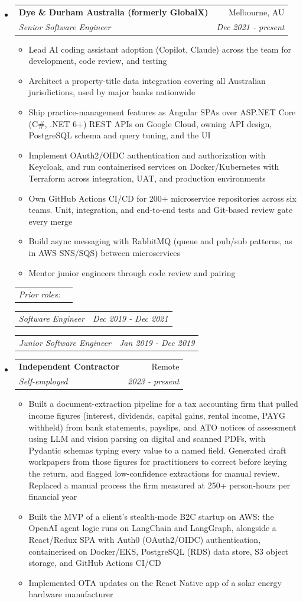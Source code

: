 \documentclass[letterpaper,11pt]{article}
\makeatletter
\newcommand{\resitem}[1]{\item #1 \vspace{-1pt}}
\newcommand{\ressubheading}[5][1.35in]{%
\begin{tabular*}{\linewidth}{@{}>{\raggedright\arraybackslash}p{\dimexpr\linewidth-#1-2pt\relax}@{\extracolsep{\fill}}r@{}}
		\textbf{#2} & #3 \\
		\textit{#4} & \textit{#5} \\
\end{tabular*}%
\vspace{3pt}%
}
\newcommand{\subsubheading}[3][2pt]{%
\vspace{#1}%
\begin{tabular*}{\linewidth}{@{}>{\raggedright\arraybackslash}p{\dimexpr\linewidth-1.35in-2pt\relax}@{\extracolsep{\fill}}r@{}}
		\textit{#2} & \textit{#3} \\
\end{tabular*}%
\vspace{2pt}%
}
\makeatother
\begin{document}
\begin{itemize}

	\item
	      \ressubheading{Dye \& Durham Australia (formerly GlobalX)}{Melbourne, AU}{Senior Software Engineer}{Dec 2021 - present}
	      \begin{itemize}
		      \resitem{Lead AI coding assistant adoption (Copilot, Claude) across the team for development, code review, and testing}
		      \resitem{Architect a property-title data integration covering all Australian jurisdictions, used by major banks nationwide}
		      \resitem{Ship practice-management features as Angular SPAs over ASP.NET Core (C\#, .NET 6+) REST APIs on Google Cloud, owning API design, PostgreSQL schema and query tuning, and the UI}
		      \resitem{Implement OAuth2/OIDC authentication and authorization with Keycloak, and run containerised services on Docker/Kubernetes with Terraform across integration, UAT, and production environments}
		      \resitem{Own GitHub Actions CI/CD for 200+ microservice repositories across six teams. Unit, integration, and end-to-end tests and Git-based review gate every merge}
		      \resitem{Build async messaging with RabbitMQ (queue and pub/sub patterns, as in AWS SNS/SQS) between microservices}
		      \resitem{Mentor junior engineers through code review and pairing}
	      \end{itemize}
	      \subsubheading{Prior roles:}{}
	      \subsubheading{Software Engineer}{Dec 2019 - Dec 2021}
	      \subsubheading{Junior Software Engineer}{Jan 2019 - Dec 2019}
	\item
	      \ressubheading{Independent Contractor}{Remote}{Self-employed}{2023 - present}
	      \begin{itemize}
		      \resitem{Built a document-extraction pipeline for a tax accounting firm that pulled income figures (interest, dividends, capital gains, rental income, PAYG withheld) from bank statements, payslips, and ATO notices of assessment using LLM and vision parsing on digital and scanned PDFs, with Pydantic schemas typing every value to a named field. Generated draft workpapers from those figures for practitioners to correct before keying the return, and flagged low-confidence extractions for manual review. Replaced a manual process the firm measured at 250+ person-hours per financial year}
		      \resitem{Built the MVP of a client's stealth-mode B2C startup on AWS: the OpenAI agent logic runs on LangChain and LangGraph, alongside a React/Redux SPA with Auth0 (OAuth2/OIDC) authentication, containerised on Docker/EKS, PostgreSQL (RDS) data store, S3 object storage, and GitHub Actions CI/CD}
		      \resitem{Implemented OTA updates on the React Native app of a solar energy hardware manufacturer}
	      \end{itemize}

\end{itemize}
\end{document}
